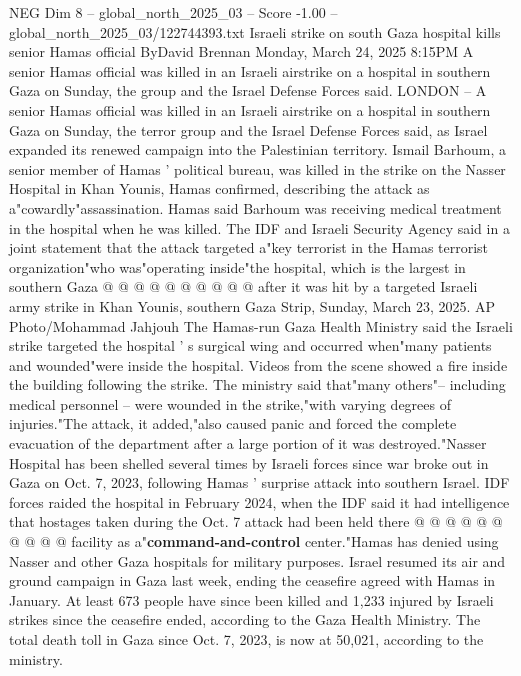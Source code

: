 \begin{textsample}{NEG Dim 8 – global\_north\_2025\_03 – Score -1.00 – global\_north\_2025\_03/122744393.txt}  \label{ex:f8_neg_360}
Israeli strike on south Gaza hospital kills senior Hamas official ByDavid Brennan Monday, March 24, 2025 8:15PM A senior Hamas official was killed in an Israeli airstrike on a hospital in southern Gaza on Sunday, the group and the Israel Defense Forces said.
LONDON -- A senior Hamas official was killed in an Israeli airstrike on a hospital in southern Gaza on Sunday, the terror group and the Israel Defense Forces said, as Israel expanded its renewed campaign into the Palestinian territory.
Ismail Barhoum, a senior member of Hamas ' political bureau, was killed in the strike on the Nasser Hospital in Khan Younis, Hamas confirmed, describing the attack as a"cowardly"assassination.
Hamas said Barhoum was receiving medical treatment in the hospital when he was killed.
The IDF and Israeli Security Agency said in a joint statement that the attack targeted a"key terrorist in the Hamas terrorist organization"who was"operating inside"the hospital, which is the largest in southern Gaza @ @ @ @ @ @ @ @ @ @ after it was hit by a targeted Israeli army strike in Khan Younis, southern Gaza Strip, Sunday, March 23, 2025.
AP Photo/Mohammad Jahjouh The Hamas-run Gaza Health Ministry said the Israeli strike targeted the hospital ' s surgical wing and occurred when"many patients and wounded"were inside the hospital.
Videos from the scene showed a fire inside the building following the strike.
The ministry said that"many others"-- including medical personnel -- were wounded in the strike,"with varying degrees of injuries."The attack, it added,"also caused panic and forced the complete evacuation of the department after a large portion of it was destroyed."Nasser Hospital has been shelled several times by Israeli forces since war broke out in Gaza on Oct. 7, 2023, following Hamas ' surprise attack into southern Israel.
IDF forces raided the hospital in February 2024, when the IDF said it had intelligence that hostages taken during the Oct. 7 attack had been held there @ @ @ @ @ @ @ @ @ @ facility as a"\textbf{command-and-control} center."Hamas has denied using Nasser and other Gaza hospitals for military purposes.
Israel resumed its air and ground campaign in Gaza last week, ending the ceasefire agreed with Hamas in January.
At least 673 people have since been killed and 1,233 injured by Israeli strikes since the ceasefire ended, according to the Gaza Health Ministry.
The total death toll in Gaza since Oct. 7, 2023, is now at 50,021, according to the ministry.

\end{textsample}
